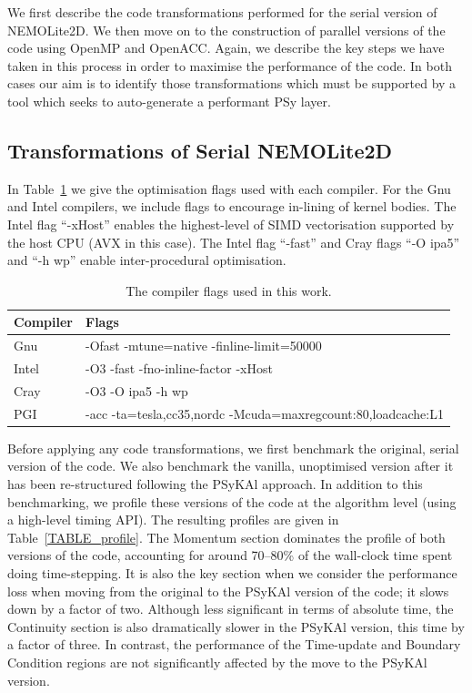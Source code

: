 \documentclass[gmdd, manuscript]{copernicus}
\begin{document}
We first describe the code transformations performed for the serial
version of NEMOLite2D.  We then move on to the construction of
parallel versions of the code using OpenMP and OpenACC. Again, we
describe the key steps we have taken in this process in order to
maximise the performance of the code. In both cases our aim is to
identify those transformations which must be supported by a tool
which seeks to auto-generate a performant PSy layer.

\subsection{Transformations of Serial NEMOLite2D}

In Table~\ref{TABLE_compiler_flags} we give the optimisation flags
used with each compiler. For the Gnu and Intel compilers, we
include flags to encourage in-lining of kernel bodies. The Intel flag
``-xHost'' enables the highest-level of SIMD vectorisation supported
by the host CPU (AVX in this case). The Intel flag ``-fast'' and Cray
flags ``-O ipa5'' and ``-h wp'' enable inter-procedural optimisation.

\begin{table}[!t]
\caption{The compiler flags used in this work.}
\label{TABLE_compiler_flags}
\centering
\begin{tabular}{l|l}
\hline
Compiler  &  Flags                                                       \\
\hline
Gnu       & -Ofast -mtune=native -finline-limit=50000                    \\
Intel     & -O3 -fast -fno-inline-factor -xHost                          \\
Cray      & -O3 -O ipa5 -h wp                                            \\
PGI       & -acc -ta=tesla,cc35,nordc -Mcuda=maxregcount:80,loadcache:L1 \\
\hline
\end{tabular}
\end{table}


Before applying any code transformations, we first benchmark the
original, serial version of the code. We also benchmark the vanilla,
unoptimised version after it has been re-structured following the
{PS}y{KA}l approach. In addition to this benchmarking, we profile these
versions of the code at the algorithm level (using a high-level timing
API). The resulting profiles are given in
Table~\ref{TABLE_profile}. The Momentum section dominates the profile
of both versions of the code, accounting for around 70--80\% of the
wall-clock time spent doing time-stepping. It is also the key section
when we consider the performance loss when moving from the original to
the {PS}y{KA}l version of the code; it slows down by a factor of
two. Although less significant in terms of absolute time, the
Continuity section is also dramatically slower in the {PS}y{KA}l version,
this time by a factor of three. In contrast, the performance of the
Time-update and Boundary Condition regions are not significantly
affected by the move to the {PS}y{KA}l version.
\end{document}
